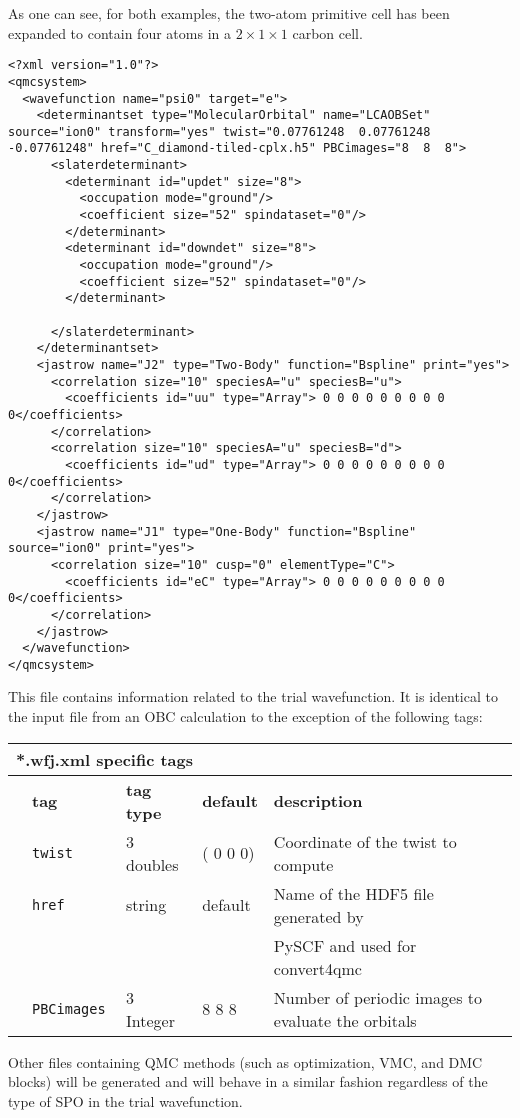   As one can see, for both examples, the two-atom primitive cell has been expanded to contain four atoms in a $2 \times 1 \times 1$ carbon cell.
\begin{lstlisting}[style=QMCPXML,caption=C\_diamond-tiled-cplx.wfj.xml. This file contains the trial wavefunction.]
<?xml version="1.0"?>
<qmcsystem>
  <wavefunction name="psi0" target="e">
    <determinantset type="MolecularOrbital" name="LCAOBSet" source="ion0" transform="yes" twist="0.07761248  0.07761248  -0.07761248" href="C_diamond-tiled-cplx.h5" PBCimages="8  8  8">
      <slaterdeterminant>
        <determinant id="updet" size="8">
          <occupation mode="ground"/>
          <coefficient size="52" spindataset="0"/>
        </determinant>
        <determinant id="downdet" size="8">
          <occupation mode="ground"/>
          <coefficient size="52" spindataset="0"/>
        </determinant>

      </slaterdeterminant>
    </determinantset>
    <jastrow name="J2" type="Two-Body" function="Bspline" print="yes">
      <correlation size="10" speciesA="u" speciesB="u">
        <coefficients id="uu" type="Array"> 0 0 0 0 0 0 0 0 0 0</coefficients>
      </correlation>
      <correlation size="10" speciesA="u" speciesB="d">
        <coefficients id="ud" type="Array"> 0 0 0 0 0 0 0 0 0 0</coefficients>
      </correlation>
    </jastrow>
    <jastrow name="J1" type="One-Body" function="Bspline" source="ion0" print="yes">
      <correlation size="10" cusp="0" elementType="C">
        <coefficients id="eC" type="Array"> 0 0 0 0 0 0 0 0 0 0</coefficients>
      </correlation>
    </jastrow>
  </wavefunction>
</qmcsystem>
 \end{lstlisting}
This file contains information related to the trial wavefunction. It is identical to the input file from an OBC calculation to the exception of the following tags:\\
\begin{table}[h]
\begin{center}
\begin{tabularx}{\textwidth}{l l l l l }
\hline
\multicolumn{5}{l}{*.wfj.xml specific tags} \\
\hline
   &   \bfseries tag     & \bfseries tag type & \bfseries default   & \bfseries description \\
   &   \texttt{twist             } &  3 doubles  &  ( 0 0 0)& Coordinate of the twist to compute\\
   &   \texttt{href             } &  string  & default& Name of the HDF5 file generated by\\ 
   &                              &          &        &  PySCF and used for convert4qmc\\  
   &   \texttt{PBCimages            } &  3 Integer   & 8 8 8  & Number of periodic images to evaluate the orbitals\\
    \hline
    \end{tabularx}
\end{center}
\end{table}

Other files containing QMC methods (such as optimization, VMC, and DMC blocks) will be generated and will behave in a similar fashion regardless of the type of SPO in the trial wavefunction. 




 

